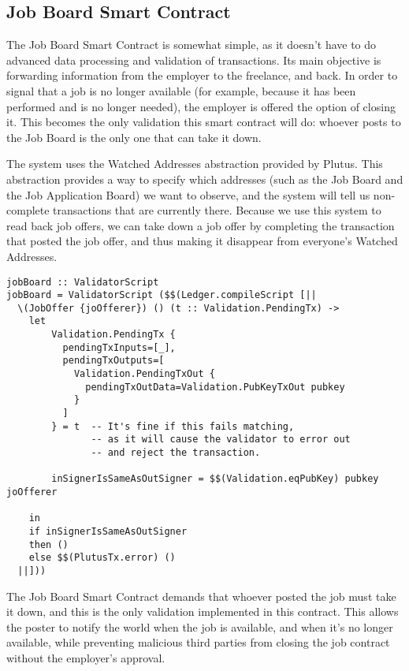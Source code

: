 \documentclass{article}
\begin{document}
\subsection{Job Board Smart Contract}
The Job Board Smart Contract is somewhat simple, as it doesn't have to do advanced data processing and validation of transactions. Its main objective is forwarding information from the employer to the freelance, and back. In order to signal that a job is no longer available (for example, because it has been performed and is no longer needed), the employer is offered the option of closing it. This becomes the only validation this smart contract will do: whoever posts to the Job Board is the only one that can take it down.

The system uses the Watched Addresses abstraction provided by Plutus. This abstraction provides a way to specify which addresses (such as the Job Board and the Job Application Board) we want to observe, and the system will tell us non-complete transactions that are currently there. Because we use this system to read back job offers, we can take down a job offer by completing the transaction that posted the job offer, and thus making it disappear from everyone's Watched Addresses.

\begin{samepage}
\begin{verbatim}
jobBoard :: ValidatorScript
jobBoard = ValidatorScript ($$(Ledger.compileScript [||
  \(JobOffer {joOfferer}) () (t :: Validation.PendingTx) ->
    let
        Validation.PendingTx {
          pendingTxInputs=[_],
          pendingTxOutputs=[
            Validation.PendingTxOut {
              pendingTxOutData=Validation.PubKeyTxOut pubkey
            }
          ]
        } = t  -- It's fine if this fails matching,
               -- as it will cause the validator to error out
               -- and reject the transaction.

        inSignerIsSameAsOutSigner = $$(Validation.eqPubKey) pubkey joOfferer

    in
    if inSignerIsSameAsOutSigner
    then ()
    else $$(PlutusTx.error) ()
  ||]))
\end{verbatim}
\end{samepage}

The Job Board Smart Contract demands that whoever posted the job must take it down, and this is the only validation implemented in this contract. This allows the poster to notify the world when the job is available, and when it's no longer available, while preventing malicious third parties from closing the job contract without the employer's approval.
\end{document}
